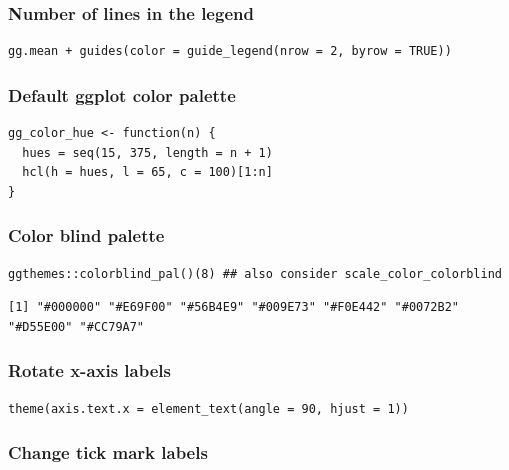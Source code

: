 \documentclass{article}
\begin{document}
\subsubsection{Number of lines in the legend}
\label{sec:org0a39c06}
\lstset{language=r,label= ,caption= ,captionpos=b,numbers=none}
\begin{lstlisting}
gg.mean + guides(color = guide_legend(nrow = 2, byrow = TRUE))
\end{lstlisting}

\subsubsection{Default ggplot color palette}
\label{sec:orgb34cc80}

\lstset{language=r,label= ,caption= ,captionpos=b,numbers=none}
\begin{lstlisting}
gg_color_hue <- function(n) {
  hues = seq(15, 375, length = n + 1)
  hcl(h = hues, l = 65, c = 100)[1:n]
}
\end{lstlisting}

\subsubsection{Color blind palette}
\label{sec:org189d259}
\lstset{language=r,label= ,caption= ,captionpos=b,numbers=none}
\begin{lstlisting}
ggthemes::colorblind_pal()(8) ## also consider scale_color_colorblind
\end{lstlisting}

\begin{verbatim}
[1] "#000000" "#E69F00" "#56B4E9" "#009E73" "#F0E442" "#0072B2" "#D55E00" "#CC79A7"
\end{verbatim}

\subsubsection{Rotate x-axis labels}
\label{sec:orgc705da7}
\lstset{language=r,label= ,caption= ,captionpos=b,numbers=none}
\begin{lstlisting}
theme(axis.text.x = element_text(angle = 90, hjust = 1))
\end{lstlisting}

\subsubsection{Change tick mark labels}
\label{sec:orgf876cff}
\end{document}
